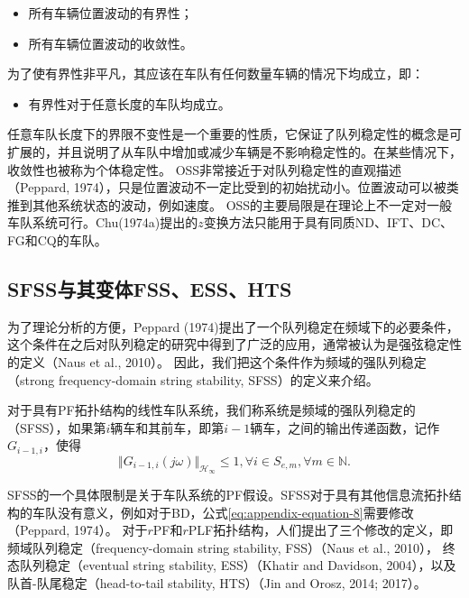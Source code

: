 \begin{translation}
\begin{itemize}
  \item 所有车辆位置波动的有界性；
  \item 所有车辆位置波动的收敛性。
\end{itemize}

为了使有界性非平凡，其应该在车队有任何数量车辆的情况下均成立，即：

\begin{itemize}
  \item 有界性对于任意长度的车队均成立。
\end{itemize}

任意车队长度下的界限不变性是一个重要的性质，它保证了队列稳定性的概念是可扩展的，并且说明了从车队中增加或减少车辆是不影响稳定性的。在某些情况下，收敛性也被称为个体稳定性。
OSS非常接近于对队列稳定性的直观描述（Peppard, 1974），只是位置波动不一定比受到的初始扰动小。位置波动可以被类推到其他系统状态的波动，例如速度。
OSS的主要局限是在理论上不一定对一般车队系统可行。Chu(1974a)提出的$z$变换方法只能用于具有同质ND、IFT、DC、FG和CQ的车队。

\subsection{SFSS与其变体FSS、ESS、HTS}

为了理论分析的方便，Peppard (1974)提出了一个队列稳定在频域下的必要条件，这个条件在之后对队列稳定的研究中得到了广泛的应用，通常被认为是强弦稳定性的定义（Naus et al., 2010）。
因此，我们把这个条件作为频域的强队列稳定（strong frequency-domain string stability, SFSS）的定义来介绍。

\begin{definition}[SFSS]
  对于具有PF拓扑结构的线性车队系统，我们称系统是频域的强队列稳定的（SFSS），如果第$i$辆车和其前车，即第$i-1$辆车，之间的输出传递函数，记作$G_{i-1,i}$，使得
  \begin{equation}
    \Vert G_{i-1,i}(j\omega) \Vert_{\mathcal{H}_\infty} \leqslant 1, \forall i \in S_{e, m}, \forall m \in \mathbb{N}.
    \label{eq:appendix-equation-8}
  \end{equation}
  \label{def:appendix-translation-def2}
\end{definition}
SFSS的一个具体限制是关于车队系统的PF假设。SFSS对于具有其他信息流拓扑结构的车队没有意义，例如对于BD，公式\ref{eq:appendix-equation-8}需要修改（Peppard, 1974）。
对于$r$PF和$r$PLF拓扑结构，人们提出了三个修改的定义，即频域队列稳定（frequency-domain string stability, FSS）（Naus et al., 2010），
终态队列稳定（eventual string stability, ESS）（Khatir and Davidson, 2004），以及队首-队尾稳定（head-to-tail stability, HTS）（Jin and Orosz, 2014; 2017）。


\end{translation}
